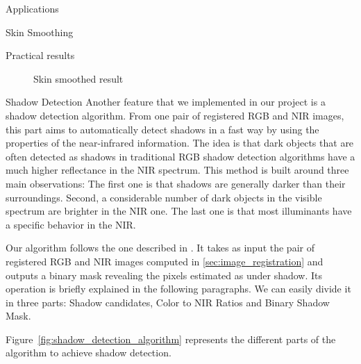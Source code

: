 \documentclass[10pt]{article}
\begin{document}
\begin{section}{Applications}
\begin{subsection}{Skin Smoothing}
\begin{subsubsection}{Practical results}
\begin{figure}[!h]
\begin{minipage}[b]{0.48\textwidth}
                    \caption{Skin smoothed result}
                    \label{fig:merging_practical2}
                \end{minipage} \hspace{0.5em} %

            \end{figure}

        \end{subsubsection}
    \end{subsection}

    \newpage

    \begin{subsection}{Shadow Detection}
        \label{sec:shadow_detection}
        Another feature that we implemented in our project is a shadow detection algorithm. From one pair of registered RGB and NIR images, this part aims to automatically detect shadows in a fast way by using the properties of the near-infrared information. The idea is that dark objects that are often detected as shadows in traditional RGB shadow detection algorithms have a much higher reflectance in the NIR spectrum. This method is built around three main observations: The first one is that shadows are generally darker than their surroundings. Second, a considerable number of dark objects in the visible spectrum are brighter in the NIR one. The last one is that most illuminants have a specific behavior in the NIR.

        \medskip

        Our algorithm follows the one described in \cite{shadow}. It takes as input the pair of registered RGB and NIR images computed in \ref{sec:image_registration} and outputs a binary mask revealing the pixels estimated as under shadow. Its operation is briefly explained in the following paragraphs. We can easily divide it in three parts: Shadow candidates, Color to NIR Ratios and Binary Shadow Mask.

        \medskip

        Figure~\ref{fig:shadow_detection_algorithm} represents the different parts of the algorithm to achieve shadow detection.


\end{subsection}
\end{section}
\end{document}
